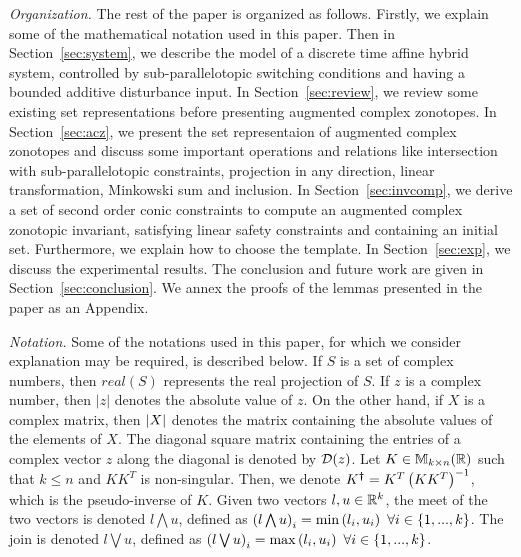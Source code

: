 \emph{Organization.}  The rest of the paper is organized as follows.  Firstly, we explain
some of the mathematical notation used in this paper.  Then in
Section~\ref{sec:system}, we describe the model of a discrete time
affine hybrid system, controlled by sub-parallelotopic switching
conditions and having a bounded additive disturbance input.  In
Section~\ref{sec:review}, we review some existing set representations
before presenting augmented complex zonotopes.  In
Section~\ref{sec:acz}, we present the set representaion of augmented
complex zonotopes and discuss some important operations and relations
like intersection with sub-parallelotopic constraints, projection in
any direction, linear transformation, Minkowski sum and inclusion.  In
Section~\ref{sec:invcomp}, we derive a set of second order conic
constraints to compute an augmented complex zonotopic invariant,
satisfying linear safety constraints and containing an initial set.
Furthermore, we explain how to choose the template.  In
Section~\ref{sec:exp}, we discuss the experimental results.  The
conclusion and future work are given in Section~\ref{sec:conclusion}.
We annex the proofs of the lemmas presented in the paper as an
Appendix.

\emph{Notation.} Some of the notations used in this paper, for which we
consider explanation may be required, is described below.  If $S$ is a
set of complex numbers, then $real(S)$ represents the real projection
of $S$.  If $z$ is a complex number, then $|z|$ denotes the absolute
value of $z$.  On the other hand, if $X$ is a complex matrix, then
$\left|X\right|$ denotes the matrix containing the absolute values of the
elements of $X$.  The diagonal square matrix containing the entries of
a complex vector $z$ along the diagonal is denoted by $\mathcal{D}(z)$.  Let
$K\in\mathbb{M}_{k\times n}(\mathbb{\mathbb{R}})$ such that $k\leq n$ and $KK^T$ is
non-singular.  Then, we denote $K^{\bm{\dagger}}=K^T\left(KK^T\right)^{-1}$, which
is the pseudo-inverse of $K$.  Given two vectors $l,u\in\mathbb{R}^k$,
the meet of the two vectors is denoted $l\bigwedge u$, defined as
$\left(l\bigwedge u\right)_i=\min\left(l_i,u_i\right)~\forall i\in\{1,...,k\}$.  The
join is denoted $l\bigvee u$, defined as $\left(l\bigvee
u\right)_i=\max\left(l_i,u_i\right)~\forall i\in\{1,...,k\}$.

